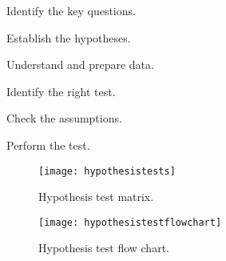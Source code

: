 	\begin{numberedlist}
		\item Identify the key questions.
		\item Establish the hypotheses.
		\item Understand and prepare data.
		\item Identify the right test.
		\item Check the assumptions.
		\item Perform the test.
	\end{numberedlist}

	\begin{figure}[tbp]
		\centering
		\texttt{[image: hypothesistests]}
		\caption[Hypothesis test matrix]{Hypothesis test matrix.}
		\label{fig:hypothesistests}
	\end{figure}

	\begin{figure}[tbp]
		\centering
		\texttt{[image: hypothesistestflowchart]}
		\caption[Hypothesis test flow chart]{Hypothesis test flow chart.}
		\label{fig:hypothesistestflowchart}
	\end{figure}




